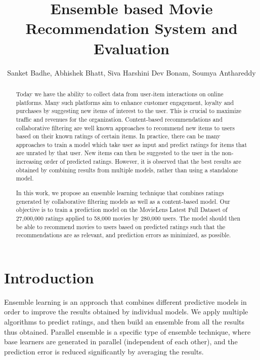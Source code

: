 \documentclass[sigconf]{acmart}
\begin{document}
\title{Ensemble based Movie Recommendation System and Evaluation}

\author{Sanket Badhe, Abhishek Bhatt, Siva Harshini Dev Bonam, Soumya Anthareddy}

\begin{abstract}
Today we have the ability to collect data from user-item interactions on online platforms. Many such platforms aim to enhance customer engagement, loyalty and purchases by suggesting new items of interest to the user. This is crucial to maximize traffic and revenues for the organization. Content-based recommendations and collaborative filtering are well known approaches to recommend new items to users based on their known ratings of certain items. In practice, there can be many approaches to train a model which take user as input and predict ratings for items that are unrated by that user. New items can then be suggested to the user in the non-increasing order of predicted ratings. However, it is observed that the best results are obtained by combining results from multiple models, rather than using a standalone model. 

In this work, we propose an ensemble learning technique that combines ratings generated by collaborative filtering models as well as a content-based model. Our objective is to train a prediction model on the MovieLens Latest Full Dataset of 27,000,000 ratings applied to 58,000 movies by 280,000 users. The model should then be able to recommend movies to users based on predicted ratings such that the recommendations are as relevant, and prediction errors as minimized, as possible.
\end{abstract}


\maketitle

\section{Introduction}
Ensemble learning is an approach that combines different predictive models in order to improve the results obtained by individual models. We apply multiple algorithms to predict ratings, and then build an ensemble from all the results thus obtained. Parallel ensemble is a specific type of ensemble technique, where base learners are generated in parallel (independent of each other), and the prediction error is reduced significantly by averaging the results.
\end{document}
